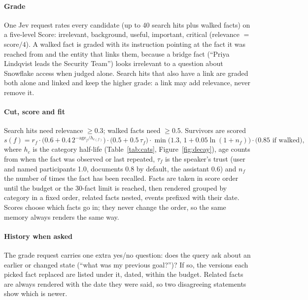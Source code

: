 \paragraph{Grade} One Jev request rates every candidate (up to 40 search hits plus walked facts) on a five-level Score:
irrelevant, background, useful, important, critical (relevance $=$ score$/4$). A walked fact is graded with its
instruction pointing at the fact it was reached from and the entity that links them, because a bridge fact
(``Priya Lindqvist leads the Security Team'') looks irrelevant to a question about Snowflake access when judged alone.
Search hits that also have a link are graded both alone and linked and keep the higher grade: a link may add
relevance, never remove it.

\paragraph{Cut, score and fit} Search hits need relevance $\ge0.3$; walked facts need $\ge0.5$. Survivors are scored
\begin{equation}
s(f) = r_f \cdot \bigl(0.6 + 0.4\, 2^{-\text{age}_f / h_{c(f)}}\bigr)\cdot\bigl(0.5+0.5\,\tau_f\bigr)\cdot
\min\bigl(1.3,\,1+0.05\ln(1+n_f)\bigr)\cdot \bigl(0.85 \text{ if walked}\bigr),
\end{equation}
where $h_c$ is the category half-life (Table~\ref{tab:cats}, Figure~\ref{fig:decay}), age counts from when the fact was
observed or last repeated, $\tau_f$ is the speaker's trust (user and named participants 1.0, documents 0.8 by default,
the assistant 0.6) and $n_f$ the number of times the fact has been recalled. Facts are taken in score order until the
budget or the 30-fact limit is reached, then rendered grouped by category in a fixed order, related facts nested,
events prefixed with their date. Scores choose which facts go in; they never change the order, so the same memory
always renders the same way.

\paragraph{History when asked} The grade request carries one extra yes/no question: does the query ask about an
earlier or changed state (``what was my previous goal?'')? If so, the versions each picked fact replaced are listed
under it, dated, within the budget. Related facts are always rendered with the date they were said, so two
disagreeing statements show which is newer.

